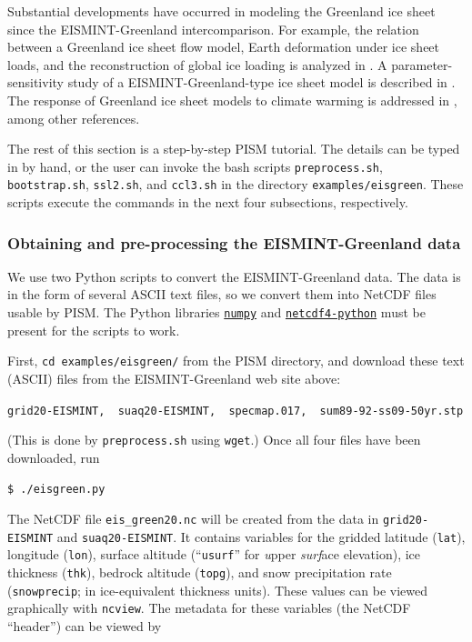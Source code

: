\documentclass[11pt,final]{amsart}
\begin{document}
Substantial developments have occurred in modeling the Greenland ice sheet since the EISMINT-Greenland intercomparison.  For example, the relation between a Greenland ice sheet flow model, Earth deformation under ice sheet loads, and the reconstruction of global ice loading is analyzed in \cite{TarasovPeltier}.  A parameter-sensitivity study of a EISMINT-Greenland-type ice sheet model is described in \cite{RitzFabreLetreguilly}.  The response of Greenland ice sheet models to climate warming is addressed in \cite{HuybrechtsdeWolde,Huybrechts02, Greve00}, among other references.

The rest of this section is a step-by-step PISM tutorial.  The details can be typed in by hand, or the user can invoke the bash scripts \verb|preprocess.sh|, \verb|bootstrap.sh|, \verb|ssl2.sh|, and \verb|ccl3.sh| in the directory \verb|examples/eisgreen|.  These scripts execute the commands in the next four subsections, respectively.

\subsubsection*{Obtaining and pre-processing the EISMINT-Greenland data}  We use two Python scripts to convert the EISMINT-Greenland data.  The data is in the form of several ASCII text files, so we convert them into NetCDF files usable by PISM.  The Python libraries \href{http://numpy.scipy.org/}{\texttt{numpy}} and \href{http://code.google.com/p/netcdf4-python/}{\texttt{netcdf4-python}} must be present for the scripts to work.

First, \verb|cd examples/eisgreen/| from the PISM directory, and download these text (ASCII) files from the EISMINT-Greenland web site above: 

\verb|grid20-EISMINT,  suaq20-EISMINT,  specmap.017,  sum89-92-ss09-50yr.stp|

\noindent (This is done by \verb|preprocess.sh| using \verb|wget|.) Once all four files have been downloaded, run

\verb|$ ./eisgreen.py|

\noindent The NetCDF file \verb|eis_green20.nc| will be created from the data in \verb|grid20-EISMINT| and \verb|suaq20-EISMINT|.  It contains variables for the gridded latitude (\verb|lat|), longitude (\verb|lon|), surface altitude (``\verb|usurf|'' for \emph{u}pper \emph{surf}ace elevation), ice thickness (\verb|thk|), bedrock altitude (\verb|topg|), and snow precipitation rate (\verb|snowprecip|; in ice-equivalent thickness units).  These values can be viewed graphically with \verb|ncview|.  The metadata for these variables (the NetCDF ``header'') can be viewed by
\end{document}
